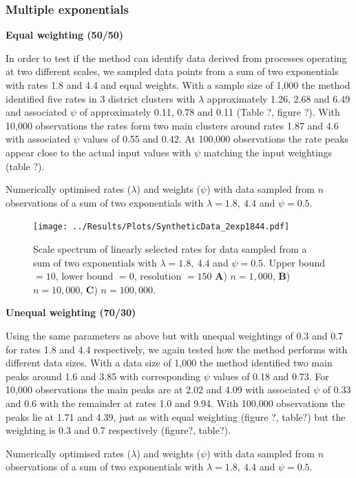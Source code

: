 \documentclass[11pt,usenames,dvipsnames]{article}
\begin{document}
\subsubsection{Multiple exponentials}

\noindent
\textbf{Equal weighting (50/50)}
\begin{linenumbers}
	
In order to test if the method can identify data derived from processes operating at two different scales, we sampled data points from a sum of two exponentials with rates 1.8 and 4.4 and equal weights. With a sample size of 1,000 the method identified five rates in 3 district clusters with $\lambda$ approximately 1.26, 2.68 and 6.49 and associated $\psi$ of approximately 0.11, 0.78 and 0.11 (Table ?, figure ?). With 10,000 observations the rates form two main clusters around rates 1.87 and 4.6 with associated $\psi$ values of 0.55 and 0.42. At 100,000 observations the rate peaks appear close to the actual input values with $\psi$ matching the input weightings (table ?).
\end{linenumbers}

\begin{table}[H]
	\centering
	\caption{Numerically optimised rates ($\lambda$) and weights ($\psi$) with data sampled from $n$ observations of a sum of two exponentials with $\lambda = 1.8,\ 4.4$ and $\psi = 0.5$.}
	
\end{table}


\begin{figure}[H]
	\centering
	\texttt{[image: ../Results/Plots/SyntheticData\_2exp1844.pdf]}
	\caption{Scale spectrum of linearly selected rates for data sampled from a sum of two exponentials with $\lambda = 1.8,\ 4.4$ and $\psi = 0.5$. Upper bound $= 10$, lower bound $= 0$, resolution $= 150$ \textbf{A}) $n = 1,000$, \textbf{B}) $n = 10,000$,  \textbf{C}) $n = 100,000$.}
\end{figure}

\noindent
\textbf{Unequal weighting (70/30)}
\begin{linenumbers}

Using the same parameters as above but with unequal weightings of 0.3 and 0.7 for rates 1.8 and 4.4 respectively, we again tested how the method performs with different data sizes. With a data size of 1,000 the method identified two main peaks around 1.6 and 3.85 with corresponding $\psi$ values of 0.18 and 0.73. For 10,000 observations the main peaks are at 2.02 and 4.09 with associated $\psi$ of 0.33 and 0.6 with the remainder at rates 1.0 and 9.94. With 100,000 observations the peaks lie at 1.71 and 4.39, just as with equal weighting (figure ?, table?) but the weighting is 0.3 and 0.7 respectively (figure?, table?).
\end{linenumbers}
\begin{table}[H]
	\centering
	\caption{Numerically optimised rates ($\lambda$) and weights ($\psi$) with data sampled from $n$ observations of a sum of two exponentials with $\lambda = 1.8,\ 4.4$ and $\psi = 0.5$.}
	
\end{table}
\end{document}
